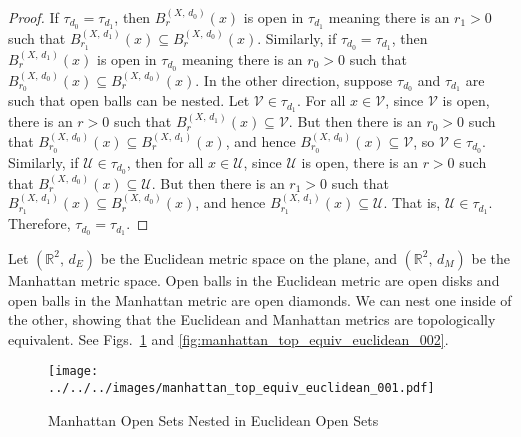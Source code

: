 \documentclass{article}
\theoremstyle{plain}
\theoremstyle{normal}
\newenvironment{example}{%
    \pushQED{\qed}\renewcommand{\qedsymbol}{$\blacksquare$}\examplex%
}{%
    \popQED\endexamplex%
}
\begin{document}
        \begin{proof}
            If $\tau_{d_{0}}=\tau_{d_{1}}$, then
            $B_{r}^{(X,\,d_{0})}(x)$ is open in
            $\tau_{d_{1}}$ meaning there is an $r_{1}>0$ such that
            $B_{r_{1}}^{(X,\,d_{1})}(x)\subseteq{B}_{r}^{(X,\,d_{0})}(x)$.
            Similarly, if $\tau_{d_{0}}=\tau_{d_{1}}$, then
            $B_{r}^{(X,\,d_{1})}(x)$ is open in
            $\tau_{d_{0}}$ meaning there is an $r_{0}>0$ such that
            $B_{r_{0}}^{(X,\,d_{0})}(x)\subseteq{B}_{r}^{(X,\,d_{0})}(x)$.
            In the other direction, suppose $\tau_{d_{0}}$ and
            $\tau_{d_{1}}$ are such that open balls can be nested.
            Let $\mathcal{V}\in\tau_{d_{1}}$. For all
            $x\in\mathcal{V}$, since $\mathcal{V}$ is open, there is an
            $r>0$ such that $B_{r}^{(X,\,d_{1})}(x)\subseteq\mathcal{V}$.
            But then there is an $r_{0}>0$ such that
            $B_{r_{0}}^{(X,\,d_{0})}(x)\subseteq{B}_{r}^{(X,\,d_{1})}(x)$, and
            hence
            $B_{r_{0}}^{(X,\,d_{0})}(x)\subseteq\mathcal{V}$, so
            $\mathcal{V}\in\tau_{d_{0}}$. Similarly, if
            $\mathcal{U}\in\tau_{d_{0}}$, then for all $x\in\mathcal{U}$, since
            $\mathcal{U}$ is open, there is an $r>0$ such that
            $B_{r}^{(X,\,d_{0})}(x)\subseteq\mathcal{U}$. But then there is
            an $r_{1}>0$ such that
            $B_{r_{1}}^{(X,\,d_{1})}(x)\subseteq{B}_{r}^{(X,\,d_{0})}(x)$, and
            hence $B_{r_{1}}^{(X,\,d_{1})}(x)\subseteq\mathcal{U}$. That is,
            $\mathcal{U}\in\tau_{d_{1}}$. Therefore,
            $\tau_{d_{0}}=\tau_{d_{1}}$.
        \end{proof}
        \begin{example}
            Let $(\mathbb{R}^{2},\,d_{E})$ be the Euclidean metric space on the
            plane, and $(\mathbb{R}^{2},\,d_{M})$ be the Manhattan metric space.
            Open balls in the Euclidean metric are open disks and open balls
            in the Manhattan metric are open diamonds. We can nest one inside
            of the other, showing that the Euclidean and Manhattan metrics are
            topologically equivalent.
            See Figs.~\ref{fig:manhattan_top_equiv_euclidean_001}
            and \ref{fig:manhattan_top_equiv_euclidean_002}.
        \end{example}
        \begin{figure}
            \centering
            \texttt{[image: ../../../images/manhattan\_top\_equiv\_euclidean\_001.pdf]}
            \caption{Manhattan Open Sets Nested in Euclidean Open Sets}
            \label{fig:manhattan_top_equiv_euclidean_001}
        \end{figure}
\end{document}
